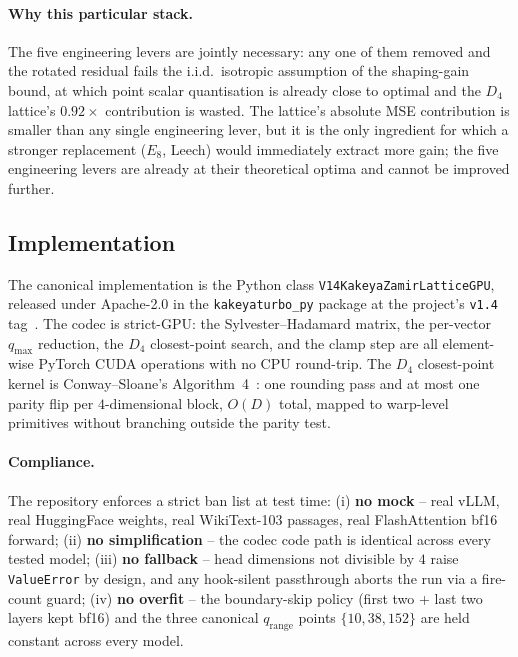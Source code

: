 \documentclass[11pt,a4paper]{article}
\theoremstyle{definition}
\theoremstyle{plain}
\begin{document}
\paragraph{Why this particular stack.}
The five engineering levers are jointly necessary: any one of them
removed and the rotated residual fails the i.i.d.\ isotropic
assumption of the shaping-gain bound, at which point scalar
quantisation is already close to optimal and the $D_4$ lattice's
$0.92\times$ contribution is wasted. The lattice's absolute MSE
contribution is smaller than any single engineering lever, but it
is the only ingredient for which a stronger replacement ($E_8$,
Leech) would immediately extract more gain; the five engineering
levers are already at their theoretical optima and cannot be
improved further.

\subsection{Implementation}

The canonical implementation is the Python class
\texttt{V14KakeyaZamirLatticeGPU}, released under Apache-2.0 in the
\texttt{kakeyaturbo\_py} package at the project's
\texttt{v1.4} tag~\cite{kakeya-v14-release}. The codec is
strict-GPU: the Sylvester--Hadamard matrix, the per-vector
$q_\mathrm{max}$ reduction, the $D_4$ closest-point search, and the
clamp step are all element-wise PyTorch CUDA operations with no CPU
round-trip. The $D_4$ closest-point kernel is Conway--Sloane's
Algorithm~4~\cite{conway-sloane-d4}: one rounding pass and at most
one parity flip per $4$-dimensional block, $O(D)$ total, mapped to
warp-level primitives without branching outside the parity test.

\paragraph{Compliance.}
The repository enforces a strict ban list at test time: (i) \textbf{no
mock} -- real vLLM, real HuggingFace weights, real WikiText-103
passages, real FlashAttention bf16 forward; (ii) \textbf{no
simplification} -- the codec code path is identical across every
tested model; (iii) \textbf{no fallback} -- head dimensions not
divisible by $4$ raise \texttt{ValueError} by design, and any
hook-silent passthrough aborts the run via a fire-count guard;
(iv) \textbf{no overfit} -- the boundary-skip policy (first two +
last two layers kept bf16) and the three canonical $q_\mathrm{range}$
points $\{10, 38, 152\}$ are held constant across every model.
\end{document}
